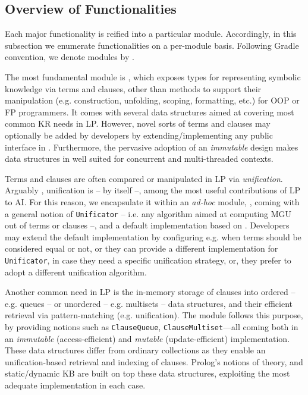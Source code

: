 \documentclass[12pt,a4paper,openright,twoside]{book}
\begin{document}
\subsection{Overview of Functionalities}
\label{ssec:functionalities}


Each major \twopkt{} functionality is reified into a particular module.
%
Accordingly, in this subsection we enumerate \twopkt{} functionalities on a per-module basis.
%
Following Gradle convention, we denote modules by .

The most fundamental module is , which exposes types for representing symbolic knowledge via terms and clauses, other than methods to support their manipulation (e.g. construction, unfolding, scoping, formatting, etc.) for OOP or FP programmers.
%
It comes with several data structures aimed at covering most common KR needs in LP.
%
However, novel sorts of terms and clauses may optionally be added by developers by extending/implementing any public interface in .
%
Furthermore, the pervasive adoption of an \emph{immutable} design makes data structures in  well suited for concurrent and multi-threaded contexts.

Terms and clauses are often compared or manipulated in LP via \emph{unification}.
%
Arguably \cite{Sterling1996}, unification \cite{unification-automatedreasoningbook2001} is -- by itself --, among the most useful contributions of LP to AI.
%
For this reason, we encapsulate it within an \emph{ad-hoc} module, , coming with a general notion of \texttt{Unificator} -- i.e. any algorithm aimed at computing MGU out of terms or clauses --, and a default implementation based on \cite{MartelliMontanari1982}.
%
Developers may extend the default implementation by configuring e.g. when terms should be considered equal or not, or they can provide a different implementation for \texttt{Unificator}, in case they need a specific unification strategy, or, they  prefer to adopt a different unification algorithm.

Another common need in LP is the in-memory storage of clauses into ordered -- e.g. queues -- or unordered -- e.g. multisets -- data structures, and their efficient retrieval via pattern-matching (e.g. unification).
%
The  module follows this purpose, by providing notions such as \texttt{ClauseQueue}, \texttt{ClauseMultiset}---all coming both in an \emph{immutable} (access-efficient) and \emph{mutable} (update-efficient) implementation.
%
These data structures differ from ordinary collections as they enable an unification-based retrieval and indexing of clauses.
%
Prolog's notions of theory, and static/dynamic KB are built on top these data structures, exploiting the most adequate implementation in each case.
\end{document}
